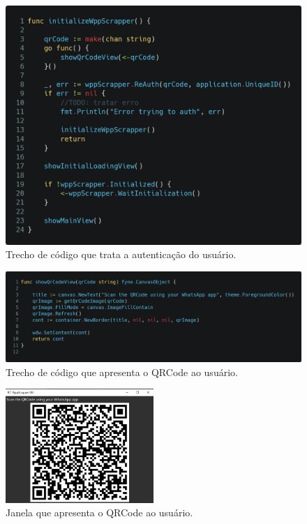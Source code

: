 \begin{figure}[h!]
    \includegraphics[width=\textwidth]{img/code_initializeWppScrapper.png}
    \caption{Trecho de código que trata a autenticação do usuário.}
    \centering
    \label{fig:initializeWppScrapper}
\end{figure}

\begin{figure}[h!]
    \includegraphics[width=\textwidth]{img/code_showQrCodeView.png}
    \caption{Trecho de código que apresenta o QRCode ao usuário.}
    \centering
    \label{fig:code_showQrCodeView}
\end{figure}

\begin{figure}[h!]
    \centering
    \includegraphics[width=0.5\textwidth]{img/gui_qrCode.png}
    \caption{Janela que apresenta o QRCode ao usuário.}
    \label{fig:gui_qrCode}
\end{figure}

